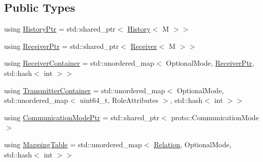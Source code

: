 \subsection*{Public Types}
\begin{DoxyCompactItemize}
\item 
using \hyperlink{classapollo_1_1cyber_1_1transport_1_1HybridReceiver_a29d008855b7b25d060137a19da928c53}{History\-Ptr} = std\-::shared\-\_\-ptr$<$ \hyperlink{classapollo_1_1cyber_1_1transport_1_1History}{History}$<$ M $>$$>$
\item 
using \hyperlink{classapollo_1_1cyber_1_1transport_1_1HybridReceiver_aa59a9c5e8a30dd56cd84e1a463d05e7c}{Receiver\-Ptr} = std\-::shared\-\_\-ptr$<$ \hyperlink{classapollo_1_1cyber_1_1transport_1_1Receiver}{Receiver}$<$ M $>$$>$
\item 
using \hyperlink{classapollo_1_1cyber_1_1transport_1_1HybridReceiver_a70475c40e8f9c33ebd8126df3ab71e18}{Receiver\-Container} = std\-::unordered\-\_\-map$<$ Optional\-Mode, \hyperlink{classapollo_1_1cyber_1_1transport_1_1HybridReceiver_aa59a9c5e8a30dd56cd84e1a463d05e7c}{Receiver\-Ptr}, std\-::hash$<$ int $>$$>$
\item 
using \hyperlink{classapollo_1_1cyber_1_1transport_1_1HybridReceiver_a6295cabae20a58ee02454f59d9c09986}{Transmitter\-Container} = std\-::unordered\-\_\-map$<$ Optional\-Mode, std\-::unordered\-\_\-map$<$ uint64\-\_\-t, Role\-Attributes $>$, std\-::hash$<$ int $>$$>$
\item 
using \hyperlink{classapollo_1_1cyber_1_1transport_1_1HybridReceiver_aec763c6c2f52e839f873b00193627626}{Communication\-Mode\-Ptr} = std\-::shared\-\_\-ptr$<$ proto\-::\-Communication\-Mode $>$
\item 
using \hyperlink{classapollo_1_1cyber_1_1transport_1_1HybridReceiver_abefb4dc42db917f5891670997814231c}{Mapping\-Table} = std\-::unordered\-\_\-map$<$ \hyperlink{namespaceapollo_1_1cyber_a688ac951fd0a3965da4acdc34c92e50f}{Relation}, Optional\-Mode, std\-::hash$<$ int $>$$>$
\end{DoxyCompactItemize}
